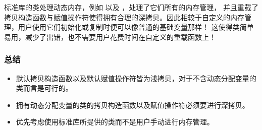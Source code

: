 \documentclass[../../LearnCpp.tex]{subfiles}
\begin{document}
标准库的类处理动态内存，例如  以及 ，处理了它们所有的内存管理，
并且重载了拷贝构造函数与赋值操作符使得拥有合理的深拷贝。因此相较于自定义的内存管理，用户使用它们初始化或复制时便可以像普通的基础变量那样！
这使得类简单易用，减少了出错，也不需要用户花费时间在自定义的重载函数上！

\subsubsection*{总结}

\begin{itemize}
    \item 默认拷贝构造函数以及默认赋值操作符皆为浅拷贝，对于不含动态分配变量的类而言是可行的。
    \item 拥有动态分配变量的类的拷贝构造函数以及赋值操作符必须要进行深拷贝。
    \item 优先考虑使用标准库所提供的类而不是用户手动进行内存管理。
\end{itemize}
\end{document}
